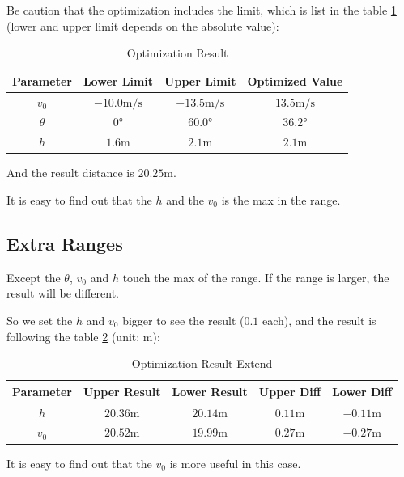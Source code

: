 \documentclass{article}
\begin{document}
Be caution that the optimization includes the limit, which is list in the table \ref{table:optimization-result} (lower and upper limit depends on the absolute value):

\begin{table}[H]
    \centering
    \begin{tabular}{cccc}
        \hline
        \textbf{Parameter} & \textbf{Lower Limit} & \textbf{Upper Limit} & \textbf{Optimized Value} \\
        \hline
        $v_0$ & $-10.0\si{\meter/\second}$ & $-13.5\si{\meter/\second}$ & $13.5\si{\meter/\second}$ \\
        $\theta$ & $0\si{\degree}$ & $60.0\si{\degree}$ & $36.2\si{\degree}$ \\
        $h$ & $1.6\si{\meter}$ & $2.1\si{\meter}$ & $2.1\si{\meter}$ \\
        \hline
    \end{tabular}
    \caption{Optimization Result}
    \label{table:optimization-result}
\end{table}

And the result distance is $20.25\si{\meter}$.

It is easy to find out that the $h$ and the $v_0$ is the max in the range.

\subsection{Extra Ranges}

Except the $\theta$, $v_0$ and $h$ touch the max of the range. If the range is larger, the result will be different.

So we set the $h$ and $v_0$ bigger to see the result ($0.1$ each), and the result is following the table \ref{table:optimization-result-extend} (unit: \si{\meter}):


\begin{table}[H]
    \centering
    \begin{tabular}{ccccc}
        \hline
        \textbf{Parameter} & \textbf{Upper Result} & \textbf{Lower Result} & \textbf{Upper Diff} & \textbf{Lower Diff} \\
        \hline
        $h$ & $20.36\si{\meter}$ & $20.14\si{\meter}$ & $0.11\si{\meter}$ & $-0.11\si{\meter}$ \\
        $v_0$ & $20.52\si{\meter}$ & $19.99\si{\meter}$ & $0.27\si{\meter}$ & $-0.27\si{\meter}$ \\
        \hline
    \end{tabular}
    \caption{Optimization Result Extend}
    \label{table:optimization-result-extend}
\end{table}


It is easy to find out that the $v_0$ is more useful in this case.
\end{document}
